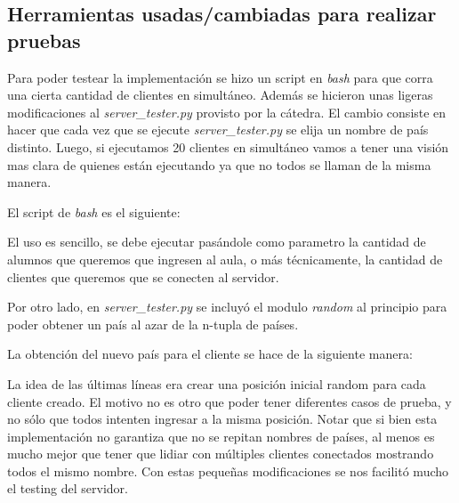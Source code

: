 \subsection{Herramientas usadas/cambiadas para realizar pruebas}
Para poder testear la implementaci\'on se hizo un script en \emph{bash} para que corra una cierta cantidad de clientes en simult\'aneo. Adem\'as se hicieron unas ligeras modificaciones al \emph{server\_tester.py} provisto por la c\'atedra. El cambio consiste en hacer que cada vez que se ejecute \emph{server\_tester.py} se elija un nombre de pa\'is distinto. Luego, si ejecutamos 20 clientes en simult\'aneo vamos a tener una visi\'on mas clara de quienes est\'an ejecutando ya que no todos se llaman de la misma manera.

El script de \emph{bash} es el siguiente:


 
 El uso es sencillo, se debe ejecutar pas\'andole como parametro la cantidad de alumnos que queremos que ingresen al aula, o m\'as t\'ecnicamente, la cantidad de clientes que queremos que se conecten al servidor.
 
Por otro lado, en \emph{server\_tester.py} se incluy\'o el modulo \emph{random} al principio para poder obtener un pa\'is al azar de la n-tupla de pa\'ises.
  


La obtenci\'on del nuevo pa\'is para el cliente se hace de la siguiente manera:


La idea de las \'ultimas l\'ineas era crear una posici\'on inicial random para cada cliente creado. El motivo no es otro que poder tener diferentes casos de prueba, y no s\'olo que todos intenten ingresar a la misma posici\'on. Notar que si bien esta implementaci\'on no garantiza que no se repitan nombres de pa\'ises, al menos es mucho mejor que tener que lidiar con m\'ultiples clientes conectados mostrando todos el mismo nombre. Con estas peque\~nas modificaciones se nos facilit\'o mucho el testing del servidor.

